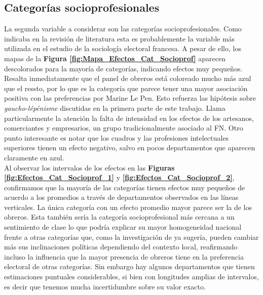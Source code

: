 \subsection{Categorías socioprofesionales}

La segunda variable a considerar son las categorías socioprofesionales. Como indicaba en la revisión de literatura esta es probablemente la variable más utilizada en el estudio de la sociología electoral francesa. A pesar de ello, los mapas de la \textbf{Figura \ref{fig:Mapa_Efectos_Cat_Socioprof}} aparecen descolorados para la mayoría de categorías, indicando efectos muy pequeños. Resalta inmediatamente que el panel de obreros está coloreado mucho más azul que el ressto, por lo que es la categoría que parece tener una mayor asociación positiva con las preferencias por Marine Le Pen. Esto refuerza las hipótesis sobre \textit{gaucho-lépénisme} discutidas en la primera parte de este trabajo. Llama particularmente la atención la falta de intensidad en los efectos de los artesanos, comerciantes y empresarios, un grupo tradicionalmente asociado al FN. Otro punto interesante es notar que los cuadros y las profesiones intelectuales superiores tienen un efecto negativo, salvo en pocos departamentos que aparecen claramente en azul.\\ 

Al observar los intervalos de los efectos en las \textbf{Figuras \ref{fig:Efectos_Cat_Socioprof_1}} y \textbf{\ref{fig:Efectos_Cat_Socioprof_2}}, confirmamos que la mayoría de las categorías tienen efectos muy pequeños de acuerdo a los promedios a través de departamentos observados en las líneas verticales. La única categoría con un efecto promedio mayor parece ser la de los obreros. Esta también sería la categoría socioprofesional más cercana a un sentimiento de clase lo que podría explicar su mayor homogeneidad nacional frente a otras categorías que, como la investigación de \textcite{MayerMichelat81} ya sugería, pueden cambiar más sus inclinaciones políticas dependiendo del contexto local, reafirmando incluso la influencia que la mayor presencia de obreros tiene en la preferencia electoral de otras categorías. Sin embargo hay algunos departamentos que tienen estimaciones puntuales considerables, si bien con longitudes amplias de intervalos, es decir que tenemos mucha incertidumbre sobre su valor exacto.\\ 

